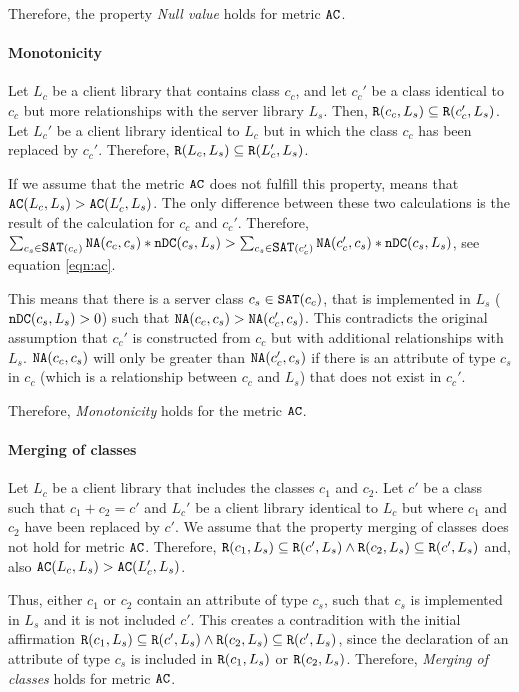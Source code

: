  Therefore, the property \textit{Null value} holds for metric $\verb|AC|$.

\paragraph{Monotonicity}
Let $L_c$ be a client library that contains class $c_c$, and let $c_c'$ be a class identical to $c_c$ but more relationships with the server library $L_s$. Then, $\verb|R|(c_c, L_s) \subseteq \verb|R|(c_c', L_s)$. Let $L_c'$ be a client library identical to $L_c$ but in which the class $c_c$ has been replaced by $c_c'$. Therefore, $\verb|R|(L_c, L_s) \subseteq \verb|R|(L_c', L_s)$.

If we assume that the metric $\verb|AC|$ does not fulfill this property, means that $\verb|AC|(L_c, L_s) > \verb|AC|(L_c', L_s)$. The only difference between these two calculations is the result of the calculation for $c_c$ and $c_c'$. Therefore, $\sum_{c_s \in \verb|SAT|(c_c)} \verb|NA|(c_c, c_s) * \verb|nDC|(c_s, L_s) > \sum_{c_s \in \verb|SAT|(c_c')} \verb|NA|(c_c', c_s) * \verb|nDC|(c_s, L_s)$, see equation \ref{eqn:ac}.

This means that there is a server class $c_s \in \verb|SAT|(c_c)$, that is implemented in $L_s$ ($\verb|nDC|(c_s, L_s) > 0$) such that $\verb|NA|(c_c, c_s) > \verb|NA|(c_c', c_s)$. This contradicts the original assumption that $c_c'$ is constructed from $c_c$ but with additional relationships with $L_s$. $\verb|NA|(c_c, c_s)$ will only be greater than $\verb|NA|(c_c', c_s)$ if there is an attribute of type $c_s$ in $c_c$ (which is a relationship between $c_c$ and $L_s$) that does not exist in $c_c'$.

Therefore, \textit{Monotonicity} holds for the metric $\verb|AC|$.

\paragraph{Merging of classes}
Let $L_c$ be a client library that includes the classes $c_1$ and $c_2$. Let $c'$ be a class such that $c_1 + c_2 = c'$ and $L_c'$ be a client library identical to $L_c$ but where $c_1$ and $c_2$ have been replaced by $c'$. We assume that the property merging of classes does not hold for metric $\verb|AC|$. Therefore, $\verb|R|(c_1, L_s) \subseteq \verb|R|(c', L_s) \land \verb|R|(c_2, L_s) \subseteq \verb|R|(c', L_s)$ and, also $\verb|AC|(L_c, L_s) > \verb|AC|(L_c', L_s)$.

Thus, either $c_1$ or $c_2$ contain an attribute of type $c_s$, such that $c_s$ is implemented in $L_s$ and it is not included $c'$. This creates a contradition with the initial affirmation $\verb|R|(c_1, L_s) \subseteq \verb|R|(c', L_s) \land \verb|R|(c_2, L_s) \subseteq \verb|R|(c', L_s)$, since the declaration of an attribute of type $c_s$ is included in $\verb|R|(c_1, L_s)$ or $\verb|R|(c_2, L_s)$. Therefore, \textit{Merging of classes} holds for metric $\verb|AC|$.

